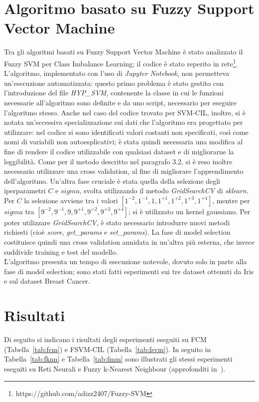 \documentclass[oneside, openany]{book}
\begin{document}
	\section{Algoritmo basato su Fuzzy Support Vector Machine}
	Tra gli algoritmi basati su Fuzzy Support Vector Machine è stato analizzato il Fuzzy SVM per Class Imbalance Learning; il codice è stato reperito in rete\footnote{https://github.com/adizz2407/Fuzzy-SVM}. L'algoritmo, implementato con l'uso di \textit{Jupyter Notebook}, non permetteva un'esecuzione automatizzata: questo primo problema è stato gestito con l'introduzione del file \textit{HYP\_SVM}, contenente la classe in cui le funzioni necessarie all'algoritmo sono definite e da uno script, necessario per eseguire l'algoritmo stesso. Anche nel caso del codice trovato per SVM-CIL, inoltre, si è notata un'eccessiva specializzazione sui dati che l'algoritmo era progettato per utilizzare: nel codice si sono identificati valori costanti non specificati, così come nomi di variabili non autoesplicativi; è stata quindi necessaria una modifica al fine di rendere il codice utilizzabile con qualsiasi dataset e di migliorarne la leggibilità. Come per il metodo descritto nel paragrafo 3.2, si è reso inoltre necessario utilizzare una cross validation, al fine di migliorare l'apprendimento dell'algoritmo. Un'altra fase cruciale è stata quella della selezione degli iperparametri $C$ e $sigma$, svolta utilizzando il metodo \textit{GridSearchCV} di \textit{sklearn}. Per $C$ la selezione avviene tra i valori $[1^{-2}, 1^{-1}, 1, 1^{+1}, 1^{+2}, 1^{+3}, 1^{+4}]$, mentre per $sigma$ tra $[9^{-2}, 9^{-1}, 9, 9^{+1}, 9^{+2}, 9^{+3}, 9^{+4}]$; si è utilizzato un kernel gaussiano. Per poter utilizzare \textit{GridSearchCV}, è stato necessario introdurre nuovi metodi richiesti (cioè \textit{score}, \textit{get\_params} e \textit{set\_params}). La fase di model selection costituisce quindi una cross validation annidata in un'altra più esterna, che invece suddivide training e test del modello.\\
	\`L'algoritmo presenta un tempo di esecuzione notevole, dovuto solo in parte alla fase di model selection; sono stati fatti esperimenti sui tre dataset ottenuti da Iris e sul dataset Breast Cancer.
	 
	\section{Risultati}
		Di seguito si indicano i risultati degli esperimenti eseguiti su FCM (Tabella~\ref{tab:fcm}) e FSVM-CIL (Tabella~\ref{tab:fsvm}). In seguito in Tabella~\ref{tab:fknn} e Tabella~\ref{tab:fmm} sono illustrati gli stessi esperimenti eseguiti su Reti Neurali e Fuzzy k-Nearest Neighbour (approfonditi in~\cite{bib:rita}).
		
\end{document}
